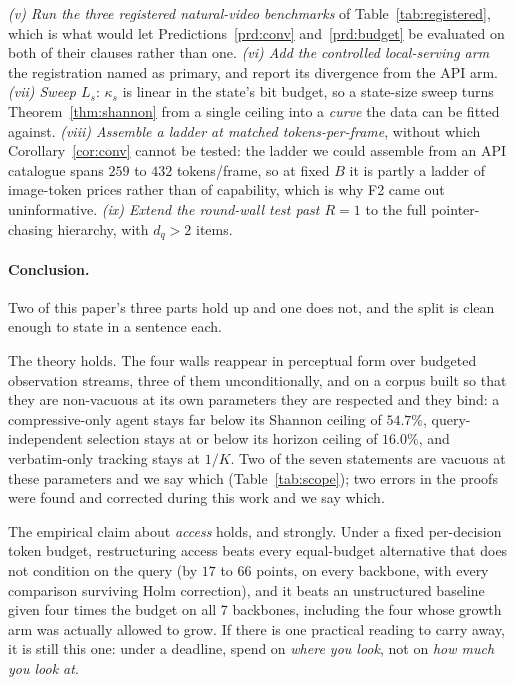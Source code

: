 \documentclass[10pt]{article}
\newcommand{\VkappaSpct}{54.7}
\newcommand{\VnBackbones}{seven}
\providecommand{\VnBackbones}{--}
\renewcommand{\VnBackbones}{7}
\theoremstyle{definition}
\theoremstyle{plain}
\begin{document}
\emph{(v) Run the three registered natural-video benchmarks} of Table~\ref{tab:registered},
which is what would let Predictions~\ref{prd:conv} and~\ref{prd:budget} be evaluated on both of
their clauses rather than one. \emph{(vi) Add the controlled local-serving arm} the
registration named as primary, and report its divergence from the API arm. \emph{(vii) Sweep
$L_s$}: $\kappa_s$ is linear in the state's bit budget, so a state-size sweep turns
Theorem~\ref{thm:shannon} from a single ceiling into a \emph{curve} the data can be fitted
against. \emph{(viii) Assemble a ladder at matched tokens-per-frame}, without which
Corollary~\ref{cor:conv} cannot be tested: the ladder we could assemble from an API catalogue
spans $259$ to $432$ tokens/frame, so at fixed $B$ it is partly a ladder of image-token prices
rather than of capability, which is why F2 came out uninformative. \emph{(ix) Extend the
round-wall test past $R{=}1$} to the full pointer-chasing hierarchy, with $d_q{>}2$ items.

\paragraph{Conclusion.} Two of this paper's three parts hold up and one does not, and the split
is clean enough to state in a sentence each.

The theory holds. The four walls reappear in perceptual form over budgeted observation streams,
three of them unconditionally, and on a corpus built so that they are non-vacuous at its own
parameters they are respected and they bind: a compressive-only agent stays far below its
Shannon ceiling of $\VkappaSpct{}\%$, query-independent selection stays at or below its horizon
ceiling of $16.0\%$, and verbatim-only tracking stays at $1/K$. Two of the seven statements are
vacuous at these parameters and we say which (Table~\ref{tab:scope}); two errors in the proofs
were found and corrected during this work and we say which.

The empirical claim about \emph{access} holds, and strongly. Under a fixed per-decision token
budget, restructuring access beats every equal-budget alternative that does not condition on the
query (by $17$ to $66$ points, on every backbone, with every comparison surviving
Holm correction), and it beats an unstructured baseline given four times the budget on all
\VnBackbones{} backbones, including the four whose growth arm was actually allowed to grow. If
there is one practical reading to carry away, it is still this one: under a deadline, spend on
\emph{where you look}, not on \emph{how much you look at}.
\end{document}
